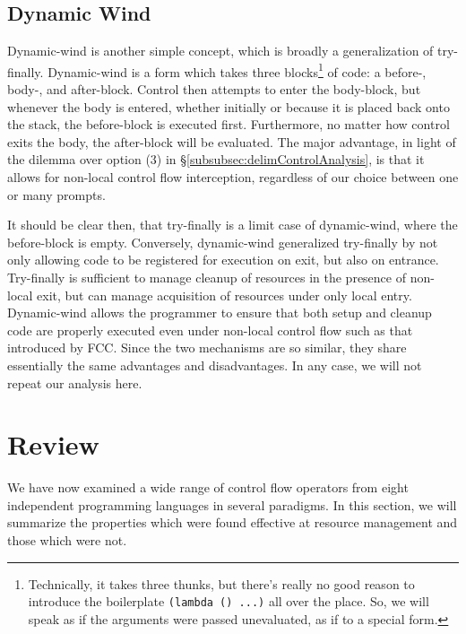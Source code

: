 \documentclass[11pt]{article}
\newcommand{\maybePage}{\null}
\begin{document}
\maybePage
\subsection{Dynamic Wind}
\label{dynamic-wind}

Dynamic-wind is another simple concept, which is broadly a generalization of try-finally.
Dynamic-wind is a form which takes three blocks\footnote{Technically, it takes three thunks, but there's really no good reason to introduce the boilerplate \texttt{(lambda () ...)} all over the place. So, we will speak as if the arguments were passed unevaluated, as if to a special form.} of code: a before-, body-, and after-block.
Control then attempts to enter the body-block, but whenever the body is entered, whether initially or because it is placed back onto the stack, the before-block is executed first.
Furthermore, no matter how control exits the body, the after-block will be evaluated.
The major advantage, in light of the dilemma over option (3) in \S\ref{subsubsec:delimControlAnalysis}, is that it allows for non-local control flow interception, regardless of our choice between one or many prompts.


It should be clear then, that try-finally is a limit case of dynamic-wind, where the before-block is empty.
Conversely, dynamic-wind generalized try-finally by not only allowing code to be registered for execution on exit, but also on entrance.
Try-finally is sufficient to manage cleanup of resources in the presence of non-local exit, but can manage acquisition of resources under only local entry.
Dynamic-wind allows the programmer to ensure that both setup and cleanup code are properly executed even under non-local control flow such as that introduced by FCC.
Since the two mechanisms are so similar, they share essentially the same advantages and disadvantages.
In any case, we will not repeat our analysis here.




\maybePage
\section{Review}
\label{sec:review}

We have now examined a wide range of control flow operators from eight independent programming languages in several paradigms.
In this section, we will summarize the properties which were found effective at resource management and those which were not.
\end{document}
